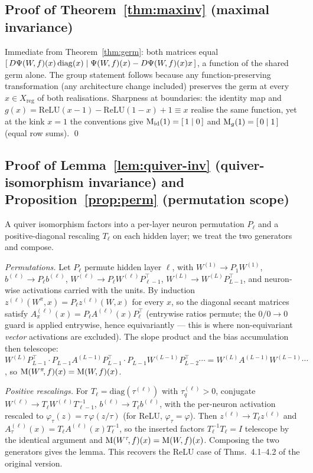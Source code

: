 \subsection{Proof of Theorem~\ref{thm:maxinv} (maximal invariance)}

Immediate from Theorem~\ref{thm:germ}: both matrices equal
$[\,D\Psi(W\!,f)(x)\,\mathrm{diag}(x)\mid \Psi(W\!,f)(x)-D\Psi(W\!,f)(x)x\,]$, a function of the shared germ
alone. The group statement follows because any function-preserving
transformation (any architecture change included) preserves the germ at every
$x\in X_{\mathrm{reg}}$ of both realisations. Sharpness at boundaries: the
identity map and $g(x)=\mathrm{ReLU}(x-1)-\mathrm{ReLU}(1-x)+1\equiv x$
realise the same function, yet at the kink $x=1$ the conventions give
$\mathrm{M}_{\mathrm{id}}(1)=[\,1\mid0\,]$ and $\mathrm{M}_g(1)=[\,0\mid1\,]$ (equal row
sums). \qed

\subsection{Proof of Lemma~\ref{lem:quiver-inv} (quiver-isomorphism invariance) and Proposition~\ref{prop:perm} (permutation scope)}

A quiver isomorphism factors into a per-layer neuron permutation $P_\ell$ and a
positive-diagonal rescaling $T_\ell$ on each hidden layer; we treat the two
generators and compose.

\emph{Permutations.} Let $P_\ell$ permute hidden layer $\ell$, with
$W^{(1)}\!\to P_1W^{(1)}$, $b^{(\ell)}\!\to P_\ell b^{(\ell)}$,
$W^{(\ell)}\!\to P_\ell W^{(\ell)}P_{\ell-1}^{\top}$,
$W^{(L)}\!\to W^{(L)}P_{L-1}^{\top}$, and neuron-wise activations carried with
the units. By induction $z^{(\ell)}(W^{\pi},x)=P_\ell z^{(\ell)}(W,x)$
for every $x$, so the diagonal secant matrices satisfy
$A^{(\ell)}_{\pi}(x)=P_\ell A^{(\ell)}(x)P_\ell^{\top}$ (entrywise ratios
permute; the $0/0\to0$ guard is applied entrywise, hence equivariantly ---
this is where non-equivariant \emph{vector} activations are excluded). The
slope product and the bias accumulation then telescope:
$W^{(L)}P_{L-1}^{\top}\cdot P_{L-1}A^{(L-1)}P_{L-1}^{\top}\cdot
P_{L-1}W^{(L-1)}P_{L-2}^{\top}\cdots=W^{(L)}A^{(L-1)}W^{(L-1)}\cdots$, so
$\mathrm{M}(W^\pi\!,f)(x)=\mathrm{M}(W\!,f)(x)$.

\emph{Positive rescalings.} For $T_\ell=\mathrm{diag}(\tau^{(\ell)})$ with
$\tau^{(\ell)}_q>0$, conjugate $W^{(\ell)}\!\to T_\ell W^{(\ell)}T_{\ell-1}^{-1}$,
$b^{(\ell)}\!\to T_\ell b^{(\ell)}$, with the per-neuron activation rescaled to
$\varphi_{\tau}(z)=\tau\,\varphi(z/\tau)$ (for ReLU, $\varphi_\tau=\varphi$).
Then $z^{(\ell)}\!\to T_\ell z^{(\ell)}$ and
$A^{(\ell)}_{\tau}(x)=T_\ell A^{(\ell)}(x)T_\ell^{-1}$, so the inserted factors
$T_\ell^{-1}T_\ell=I$ telescope by the identical argument and
$\mathrm{M}(W^\tau\!,f)(x)=\mathrm{M}(W\!,f)(x)$. Composing the two generators gives the lemma.
This recovers the ReLU case of Thms.~4.1--4.2 of the original version.

